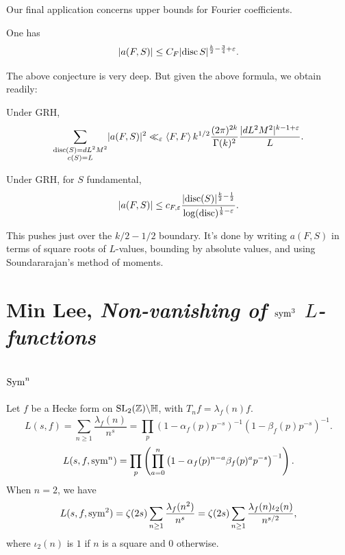 \documentclass[reqno]{amsart} 
\begin{document}
Our final application concerns upper bounds for Fourier coefficients.
\begin{conjecture}\label{conjecture:cnfg5ktz3k}
  One has
  \begin{equation*}
    \left\lvert a(F, S) \right\rvert \leq C_F \lvert \operatorname{disc} S \rvert^{\frac{k}{2} - \frac{3}{4} + \varepsilon}.
  \end{equation*}
\end{conjecture}
The above conjecture is very deep.  But given the above formula, we obtain readily:
\begin{theorem}\label{theorem:cnfg5nd8f6}
  Under GRH,
  \begin{equation*}
    \sum_{
      \substack{
        \operatorname{disc}(S) = d L^2 M^2 
        \\
        c(S) = L        
      }
    }
    \lvert a(F, S) \rvert^2
    \ll_\varepsilon \left\langle F, F \right\rangle k^{1/2} \frac{(2 \pi )^{2 k }}{\Gamma(k)^2 }
    \frac{\lvert d L^2 M^2 \rvert^{k - 1 + \varepsilon }}{L}.
  \end{equation*}
\end{theorem}

\begin{theorem}\label{theorem:cnfg5nkh9a}
  Under GRH, for $S$ fundamental,
  \begin{equation*}
    \lvert a(F, S) \rvert \leq c_{F, \varepsilon } \frac{\lvert \operatorname{disc} (S) \rvert^{\frac{k}{2} - \frac{1}{2}}}{\log(\operatorname{disc})^{\frac{1}{8} - \varepsilon}}.
  \end{equation*}
\end{theorem}
This pushes just over the $k/2-1/2$ boundary.  It's done by writing $a(F,S)$ in terms of square roots of $L$-values, bounding by absolute values, and using Soundararajan's method of moments.


\section{Min Lee, \emph{Non-vanishing of $\operatorname{sym}^3$ $L$-functions}\label{sec:cnfhlpuqfl}}

\subsection{$\operatorname{Sym}^n$}
Let $f$ be a Hecke form on $\operatorname{SL}_2(\mathbb{Z}) \backslash \mathbb{H}$, with $T_n f = \lambda_f(n) f$.
\begin{equation*}
  L(s, f) = \sum_{n \geq 1} \frac{\lambda_f(n)}{ n^s}
  = \prod_p \left( 1 - \alpha_f(p) p^{- s} \right)^{-1}  \left( 1 - \beta_f(p) p^{- s} \right)^{-1}.
\end{equation*}
\begin{equation*}
L(s, f, \operatorname{sym}^n) = \prod_p \left( \prod_{a = 0}^n \left( 1 - \alpha_f(p)^{n - a} \beta_f(p)^a p^{- s} \right)^{-1}  \right).
\end{equation*}
When $n = 2$, we have
\begin{equation*}
  L(s, f, \operatorname{sym}^2) = \zeta(2s) \sum_{n \geq 1} \frac{\lambda_f(n^2)}{n^s}
  = \zeta(2 s)
  \sum_{n \geq 1}
  \frac{\lambda_f(n) \iota_2(n)}{n^{s/2}},
\end{equation*}
where $\iota_2(n)$ is $1$ if $n$ is a square and $0$ otherwise.
\end{document}
